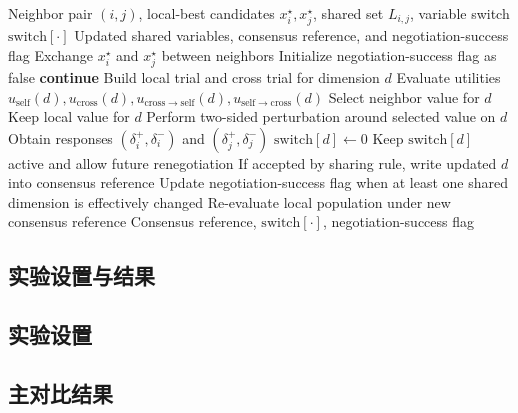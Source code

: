 \documentclass[12pt]{ctexart}
\begin{document}
\begin{algorithm}[htbp]
\caption{Negotiation with Two-Sided Consistency Check (Abstract)}
\label{alg:negotiation_consistency}
\begin{algorithmic}[1]
\Require Neighbor pair \((i,j)\), local-best candidates \(x_i^\star,x_j^\star\), shared set \(L_{i,j}\), variable switch \(\mathrm{switch}[\cdot]\)
\Ensure Updated shared variables, consensus reference, and negotiation-success flag
\State Exchange \(x_i^\star\) and \(x_j^\star\) between neighbors
\State Initialize negotiation-success flag as false
    \State \textbf{continue} 
  \EndIf
  \State Build local trial and cross trial for dimension \(d\)
  \State Evaluate utilities \(u_{\mathrm{self}}(d),u_{\mathrm{cross}}(d),u_{\mathrm{cross}\rightarrow\mathrm{self}}(d),u_{\mathrm{self}\rightarrow\mathrm{cross}}(d)\)
    \State Select neighbor value for \(d\)
  \Else
    \State Keep local value for \(d\)
  \EndIf
  \State Perform two-sided perturbation around selected value on \(d\)
  \State Obtain responses \((\delta_i^+,\delta_i^-)\) and \((\delta_j^+,\delta_j^-)\)
    \State \(\mathrm{switch}[d]\gets 0\) 
  \Else
    \State Keep \(\mathrm{switch}[d]\) active and allow future renegotiation
  \EndIf
  \State If accepted by sharing rule, write updated \(d\) into consensus reference
  \State Update negotiation-success flag when at least one shared dimension is effectively changed
\EndFor
\State Re-evaluate local population under new consensus reference
\State \Return Consensus reference, \(\mathrm{switch}[\cdot]\), negotiation-success flag
\end{algorithmic}
\end{algorithm}

\subsection{实验设置与结果}\label{sec:experiments}

\subsection{实验设置}


\subsection{主对比结果}
\end{document}
